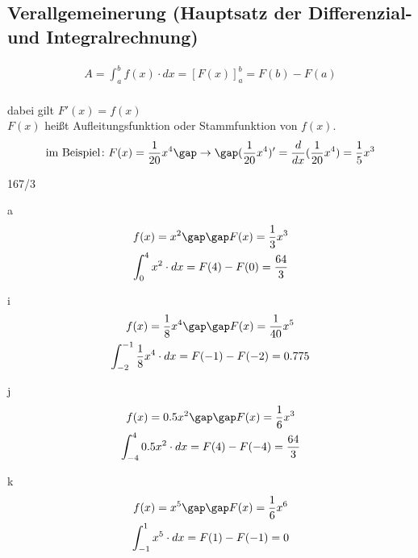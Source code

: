 \subsection{Verallgemeinerung (Hauptsatz der Differenzial- und Integralrechnung)}
\begin{gather*}
  A = \int_a^b f(x) \cdot dx = \left[F(x)\right]_a^b = F(b) - F(a)
\end{gather*} \\
dabei gilt $F'(x) = f(x)$ \\
$F(x)$ heißt Aufleitungsfunktion oder Stammfunktion von $f(x)$.
\begin{gather*}
  \text{im Beispiel} \colon F(x) = \frac{1}{20}x^4 \gap\rightarrow\gap (\frac{1}{20}x^4)' = \frac{d}{dx}(\frac{1}{20}x^4) = \frac{1}{5}x^3
\end{gather*}
\begin{exercise}{167/3}
  \item [a]
  \begin{gather*}
    f(x) = x^2 \gap\gap F(x) = \frac{1}{3}x^3 \\
    \int_0^4 x^2 \cdot dx = F(4) - F(0) = \frac{64}{3}
  \end{gather*}
  \item [i]
  \begin{gather*}
    f(x) = \frac{1}{8}x^4 \gap\gap F(x) = \frac{1}{40}x^5 \\
    \int_{-2}^{-1} \frac{1}{8}x^4 \cdot dx = F(-1) - F(-2) = 0.775
  \end{gather*}
  \item [j]
  \begin{gather*}
    f(x) = 0.5x^2 \gap\gap F(x) = \frac{1}{6}x^3 \\
    \int_{-4}^4 0.5x^2 \cdot dx = F(4) - F(-4) = \frac{64}{3}
  \end{gather*}
  \item [k]
  \begin{gather*}
    f(x) = x^5 \gap\gap F(x) = \frac{1}{6}x^6 \\
    \int_{-1}^1 x^5 \cdot dx = F(1) - F(-1) = 0
  \end{gather*}
\end{exercise}
